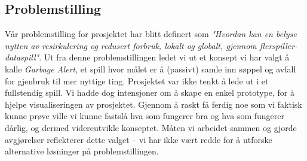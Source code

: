 	\subsection{Problemstilling}
	Vår problemstilling for prosjektet har blitt definert som \emph{"Hvordan kan en belyse nytten av resirkulering og redusert forbruk, lokalt og globalt, gjennom flerspiller-dataspill"}. Ut fra denne problemstillingen ledet vi ut et konsept vi har valgt å kalle \emph{Garbage Alert}, et spill hvor målet er å (passivt) samle inn søppel og avfall for gjenbruk til mer nyttige ting. Prosjektet var ikke tenkt å lede ut i et fullstendig spill. Vi hadde dog intensjoner om å skape en enkel prototype, for å hjelpe visualiseringen av prosjektet. Gjennom å raskt få ferdig noe som vi faktisk kunne prøve ville vi kunne fastslå hva som fungerer bra og hva som fungerer dårlig, og dermed videreutvikle konseptet. Måten vi arbeidet sammen og gjorde avgjørelser reflekterer dette valget – vi har ikke vært redde for å utforske alternative løsninger på problemstillingen.


